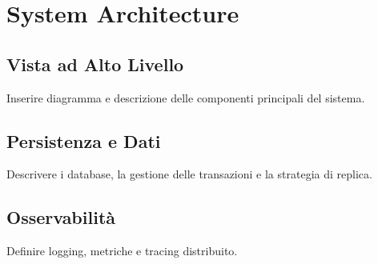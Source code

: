 \chapter{System Architecture}

\section{Vista ad Alto Livello}
Inserire diagramma e descrizione delle componenti principali del sistema.

\section{Persistenza e Dati}
Descrivere i database, la gestione delle transazioni e la strategia di replica.

\section{Osservabilità}
Definire logging, metriche e tracing distribuito.
